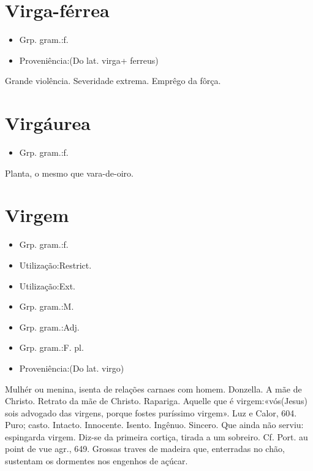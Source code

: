 \documentclass{article}
\begin{document}
\section{Virga-férrea}
\begin{itemize}
\item {Grp. gram.:f.}
\end{itemize}
\begin{itemize}
\item {Proveniência:(Do lat. \textunderscore virga\textunderscore  + \textunderscore ferreus\textunderscore )}
\end{itemize}
Grande violência.
Severidade extrema.
Emprêgo da fôrça.
\section{Virgáurea}
\begin{itemize}
\item {Grp. gram.:f.}
\end{itemize}
Planta, o mesmo que \textunderscore vara-de-oiro\textunderscore .
\section{Virgem}
\begin{itemize}
\item {Grp. gram.:f.}
\end{itemize}
\begin{itemize}
\item {Utilização:Restrict.}
\end{itemize}
\begin{itemize}
\item {Utilização:Ext.}
\end{itemize}
\begin{itemize}
\item {Grp. gram.:M.}
\end{itemize}
\begin{itemize}
\item {Grp. gram.:Adj.}
\end{itemize}
\begin{itemize}
\item {Grp. gram.:F. pl.}
\end{itemize}
\begin{itemize}
\item {Proveniência:(Do lat. \textunderscore virgo\textunderscore )}
\end{itemize}
Mulhér ou menina, isenta de relações carnaes com homem.
Donzella.
A mãe de Christo.
Retrato da mãe de Christo.
Rapariga.
Aquelle que é virgem:«\textunderscore vós\textunderscore  (Jesus) \textunderscore sois advogado das virgens, porque fostes puríssimo virgem\textunderscore ». \textunderscore Luz e Calor\textunderscore , 604.
Puro; casto.
Intacto.
Innocente.
Isento.
Ingênuo.
Sincero.
Que ainda não serviu: \textunderscore espingarda virgem\textunderscore .
Diz-se da primeira cortiça, tirada a um sobreiro. Cf. \textunderscore Port. au point de vue agr.\textunderscore , 649.
Grossas traves de madeira que, enterradas no chão, sustentam os dormentes nos engenhos de açúcar.
\end{document}
